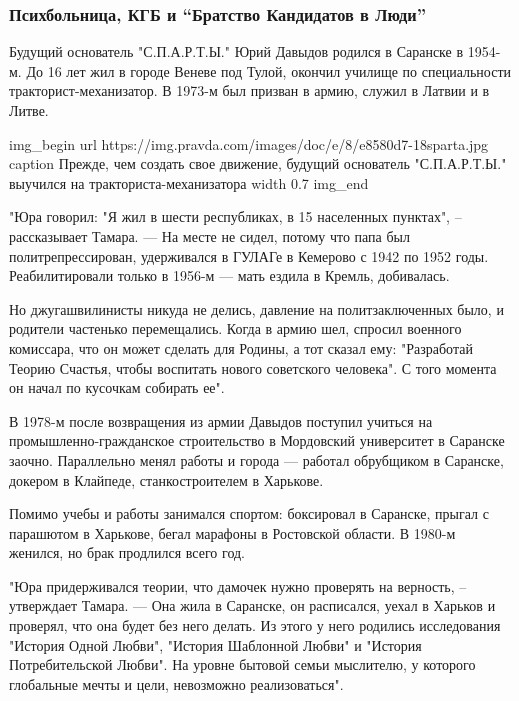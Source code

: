 
 
 

\subsubsection{Психбольница, КГБ и ``Братство Кандидатов в Люди''}

Будущий основатель "С.П.А.Р.Т.Ы." Юрий Давыдов родился в Саранске в 1954-м. До
16 лет жил в городе Веневе под Тулой, окончил училище по специальности
тракторист-механизатор. В 1973-м был призван в армию, служил в Латвии и в
Литве.

\ifcmt
img_begin 
	url https://img.pravda.com/images/doc/e/8/e8580d7-18sparta.jpg
	caption Прежде, чем создать свое движение, будущий основатель "С.П.А.Р.Т.Ы." выучился на тракториста-механизатора
	width 0.7
img_end
\fi

"Юра говорил: "Я жил в шести республиках, в 15 населенных пунктах", –
рассказывает Тамара. --- На месте не сидел, потому что папа был
политрепрессирован, удерживался в ГУЛАГе в Кемерово с 1942 по 1952 годы.
Реабилитировали только в 1956-м --- мать ездила в Кремль, добивалась. 

Но джугашвилинисты никуда не делись, давление на политзаключенных было, и
родители частенько перемещались. Когда в армию шел, спросил военного комиссара,
что он может сделать для Родины, а тот сказал ему: "Разработай Теорию Счастья,
чтобы воспитать нового советского человека". С того момента он начал по
кусочкам собирать ее".

В 1978-м после возвращения из армии Давыдов поступил учиться на
промышленно-гражданское строительство в Мордовский университет в Саранске
заочно. Параллельно менял работы и города --- работал обрубщиком в Саранске,
докером в Клайпеде, станкостроителем в Харькове. 

Помимо учебы и работы занимался спортом: боксировал в Саранске, прыгал с
парашютом в Харькове, бегал марафоны в Ростовской области. В 1980-м женился, но
брак продлился всего год.

"Юра придерживался теории, что дамочек нужно проверять на верность, –
утверждает Тамара. --- Она жила в Саранске, он расписался, уехал в Харьков и
проверял, что она будет без него делать. Из этого у него родились исследования
"История Одной Любви", "История Шаблонной Любви" и "История Потребительской
Любви". На уровне бытовой семьи мыслителю, у которого глобальные мечты и цели,
невозможно реализоваться".

